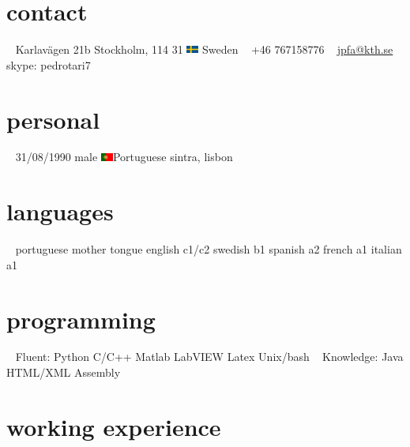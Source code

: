\documentclass[]{friggeri-cv} %
\begin{document}


\begin{aside} %

\section{contact}
~
Karlavägen 21b
Stockholm, 114 31
\includegraphics[width=0.4cm,height=0.3cm]{sweden} Sweden
~
+46 767158776
~
\href{mailto:jpfa@kth.se}{jpfa@kth.se}
skype: pedrotari7
\section{personal}
~
31/08/1990
male
\includegraphics[width=0.4cm,height=0.3cm]{portugal}Portuguese
sintra, lisbon
\section{languages}
~
portuguese mother tongue
english c1/c2
swedish b1
spanish a2
french a1
italian a1
\section{programming}
~
Fluent:
Python
C/C++
Matlab
LabVIEW
Latex
Unix/bash
~
Knowledge:
Java
HTML/XML
Assembly 
\end{aside}



\section{working experience}
\end{document}
